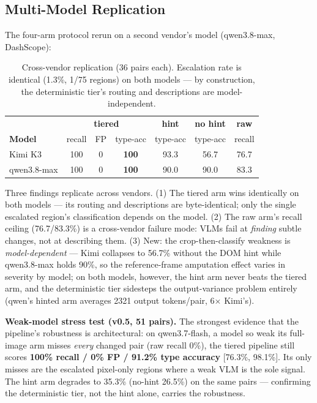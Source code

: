 \documentclass[10pt,twocolumn,letterpaper]{article}
\begin{document}
\subsection{Multi-Model Replication}

The four-arm protocol rerun on a second vendor's model (qwen3.8-max, DashScope):

\begin{table}[h]
\centering
\small
\begin{tabular}{lcccccc}
\toprule
 & \multicolumn{3}{c}{\textbf{tiered}} & \textbf{hint} & \textbf{no hint} & \textbf{raw} \\
\textbf{Model} & recall & FP & type-acc & type-acc & type-acc & recall \\
\midrule
Kimi K3 & 100 & 0 & \textbf{100} & 93.3 & 56.7 & 76.7 \\
qwen3.8-max & 100 & 0 & \textbf{100} & 90.0 & 90.0 & 83.3 \\
\bottomrule
\end{tabular}
\caption{Cross-vendor replication (36 pairs each). Escalation rate is identical (1.3\%, 1/75 regions) on both models — by construction, the deterministic tier's routing and descriptions are model-independent.}
\label{tab:multimodel}
\end{table}

Three findings replicate across vendors. (1) The tiered arm wins identically on both models — its routing and descriptions are byte-identical; only the single escalated region's classification depends on the model. (2) The raw arm's recall ceiling (76.7/83.3\%) is a cross-vendor failure mode: VLMs fail at \textit{finding} subtle changes, not at describing them. (3) New: the crop-then-classify weakness is \textit{model-dependent} — Kimi collapses to 56.7\% without the DOM hint while qwen3.8-max holds 90\%, so the reference-frame amputation effect varies in severity by model; on both models, however, the hint arm never beats the tiered arm, and the deterministic tier sidesteps the output-variance problem entirely (qwen's hinted arm averages 2321 output tokens/pair, 6$\times$ Kimi's).

\textbf{Weak-model stress test (v0.5, 51 pairs).} The strongest evidence that the pipeline's robustness is architectural: on qwen3.7-flash, a model so weak its full-image arm misses \emph{every} changed pair (raw recall 0\%), the tiered pipeline still scores \textbf{100\% recall / 0\% FP / 91.2\% type accuracy} [76.3\%, 98.1\%]. Its only misses are the escalated pixel-only regions where a weak VLM is the sole signal. The hint arm degrades to 35.3\% (no-hint 26.5\%) on the same pairs — confirming the deterministic tier, not the hint alone, carries the robustness.
\end{document}
